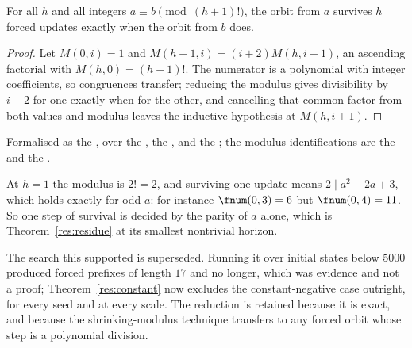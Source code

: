 \begin{theorem}\label{res:residue}
For all $h$ and all integers $a\equiv b \pmod{(h+1)!}$, the orbit from $a$
survives $h$ forced updates exactly when the orbit from $b$ does.
\end{theorem}

\begin{proof}
Let $M(0,i)=1$ and $M(h+1,i)=(i+2)M(h,i+1)$, an ascending factorial with
$M(h,0)=(h+1)!$.  The numerator is a polynomial with integer coefficients, so
congruences transfer; reducing the modulus gives divisibility by $i+2$ for one
exactly when for the other, and cancelling that common factor from both values
and modulus leaves the inductive hypothesis at $M(h,i+1)$.
\end{proof}

\noindent Formalised as the
, over the
, the
, and the
; the modulus identifications are the
 and the
.

At $h=1$ the modulus is $2!=2$, and surviving one update means
$2\mid a^{2}-2a+3$, which holds exactly for odd $a$: for instance
$\fnum(0,3)=6$ but $\fnum(0,4)=11$.  So one step of survival is decided by the
parity of $a$ alone, which is Theorem~\ref{res:residue} at its smallest
nontrivial horizon.

The search this supported is superseded.  Running it over initial states below
$5000$ produced forced prefixes of length $17$ and no longer, which was
evidence and not a proof; Theorem~\ref{res:constant} now excludes the
constant-negative case outright, for every seed and at every scale.  The
reduction is retained because it is exact, and because the shrinking-modulus
technique transfers to any forced orbit whose step is a polynomial division.
